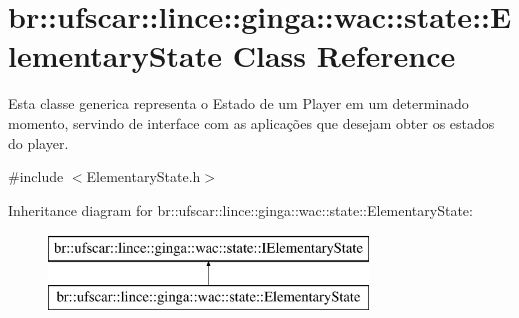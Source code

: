 \hypertarget{classbr_1_1ufscar_1_1lince_1_1ginga_1_1wac_1_1state_1_1ElementaryState}{
\section{br::ufscar::lince::ginga::wac::state::ElementaryState Class Reference}
\label{classbr_1_1ufscar_1_1lince_1_1ginga_1_1wac_1_1state_1_1ElementaryState}
}


Esta classe generica representa o Estado de um Player em um determinado momento, servindo de interface com as aplicações que desejam obter os estados do player.  




{\ttfamily \#include $<$ElementaryState.h$>$}

Inheritance diagram for br::ufscar::lince::ginga::wac::state::ElementaryState:\begin{figure}[H]
\begin{center}
\leavevmode
\includegraphics[height=2cm]{classbr_1_1ufscar_1_1lince_1_1ginga_1_1wac_1_1state_1_1ElementaryState}
\end{center}
\end{figure}
